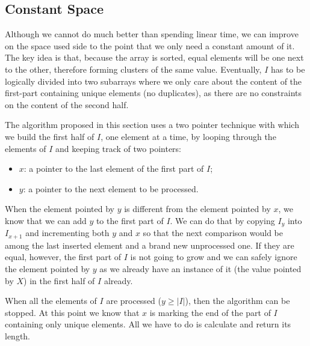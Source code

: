 

\subsection{Constant Space}
\label{sec:remove_duplicated_sorted_array_inplace:constant_space}

Although we cannot do much better than spending linear time, we can improve on the space used side to the point that we only need a constant amount of it.
The key idea is that, because the array is sorted, equal elements will be one next
to the other, therefore forming clusters of the same value. 
Eventually, $I$ has to be logically divided into
two subarrays where we only care about the content of the first-part containing unique elements (no duplicates), as
there are no constraints on the content of the second half.

The algorithm proposed in this section uses a two pointer technique with which we
build the first half of $I$, one element at a time, by looping through the
elements of $I$ and keeping track of two pointers:

\begin{itemize}
	\item $x$: a pointer to the last element of the first part of $I$;
	\item $y$: a pointer to the next element to be processed.
\end{itemize}

When the element pointed by $y$ is different from the element pointed by $x$, we know that we can add
$y$ to the first part of $I$. We can do that by copying $I_y$ into $I_{x+1}$ and incrementing both
$y$ and $x$ so that the next comparison would be among the last inserted element and a brand new unprocessed one.
If they are equal, however, the first part of $I$ is not going to grow and we can
safely ignore the element pointed by $y$ as we already have an instance of it (the value pointed by $X$) in the first half of $I$ already.

When all the elements of $I$ are processed ($y \geq |I|$), then the algorithm can be stopped. 
At this point
we know that $x$ is marking the end of the part of $I$ containing only unique elements. 
All we have to do is calculate and return its length. 

